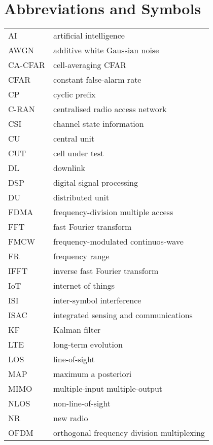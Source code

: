 \chapter*{Abbreviations and Symbols} %

\begin{table}[H]
	\begin{tabular}{ll}
		AI & artificial intelligence \\[2px]
		AWGN & additive white Gaussian noise \\[2px]
		CA-CFAR & cell-averaging CFAR \\[2px]
		CFAR & constant false-alarm rate \\[2px]
		CP & cyclic prefix \\[2px]
		C-RAN & centralised radio access network \\[2px]
		CSI & channel state information \\[2px]
		CU & central unit  \\[2px]
		CUT & cell under test \\[2px]
		DL & downlink \\[2px]
		DSP & digital signal processing \\[2px]
		DU & distributed unit \\[2px]
		FDMA & frequency-division multiple access \\[2px]
		FFT & fast Fourier transform \\[2px]
		FMCW & frequency-modulated continuos-wave \\[2px]
		FR & frequency range \\[2px]
		IFFT  & inverse fast Fourier transform \\[2px]
		IoT & internet of things \\[2px]
		ISI & inter-symbol interference \\[2px]
		ISAC & integrated sensing and communications \\[2px]
		KF & Kalman filter \\[2px]
		LTE & long-term evolution \\[2px]
		LOS & line-of-sight \\[2px]
		MAP & maximum a posteriori \\[2px]
		MIMO & multiple-input multiple-output \\[2px]
		NLOS & non-line-of-sight \\[2px]
		NR & new radio\\[2px]
		OFDM & orthogonal frequency division multiplexing \\[2px]

\end{tabular}
\end{table}
